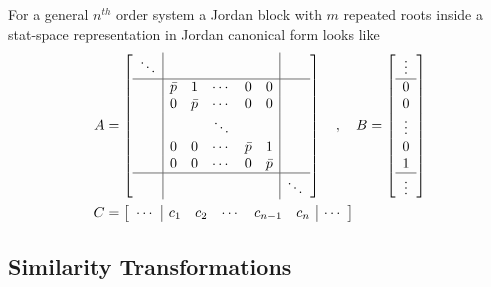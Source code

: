 \documentclass[twoside]{article}
\begin{document}
For a general $n^{th}$ order system a Jordan block 
with $m$ repeated roots inside a stat-space representation
in Jordan canonical form looks like
%
\begin{align*}
A &= \left[ \begin{array}{c|ccccc|c} 
\ddots & & & & & &
\\ \hline
& \bar{p} & 1 & \cdots & 0 & 0 & 
\\ & 0 & \bar{p} & \cdots & 0 & 0
\\ & & & \ddots & & & 
\\ & 0 & 0 & \cdots & \bar{p} & 1
    \\ & 0 & 0 & \cdots & 0 & \bar{p}
\\
\hline
& & & & & & \ddots
 \end{array} \right]
\quad , \quad 
B = \left[ \begin{array}{c} \vdots \\\hline 
0 \\ 0 \\ \vdots \\ 0 \\  1 \\ \hline
\vdots
\end{array} \right]
\\ C &= \left[ \begin{array}{c|ccccc|c} \cdots & 
c_1 & c_2 & \cdots &  c_{n-1} & c_n & \cdots\end{array} \right]
\end{align*}
%

\subsection*{Similarity Transformations}
\end{document}
